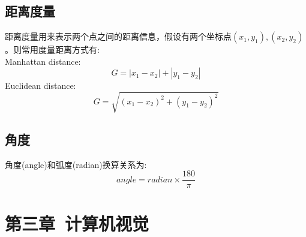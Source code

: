 \documentclass[12pt]{book}
\begin{document}
 \section{距离度量}
 距离度量用来表示两个点之间的距离信息，假设有两个坐标点$(x_1, y_1), (x_2, y_2)$。则常用度量距离方式有:\\
Manhattan distance:
 \begin{equation}\label{eq:manhattan-distance}
	G = |x_1 - x_2| + |y_1 - y_2|
\end{equation}
Euclidean distance:
 \begin{equation}\label{eq:euclidean-distance}
	G = \sqrt{(x_1 - x_2)^{2} + (y_1 - y_2)^{2}}
\end{equation}

 \section{角度}
 角度(angle)和弧度(radian)换算关系为:
  \begin{equation}\label{eq:angle2radia}
 	angle = radian \times \frac{180}{\pi}
 \end{equation}
\newpage
 
\fancyhead{}

\chapter{第三章\ 计算机视觉}

\end{document}
